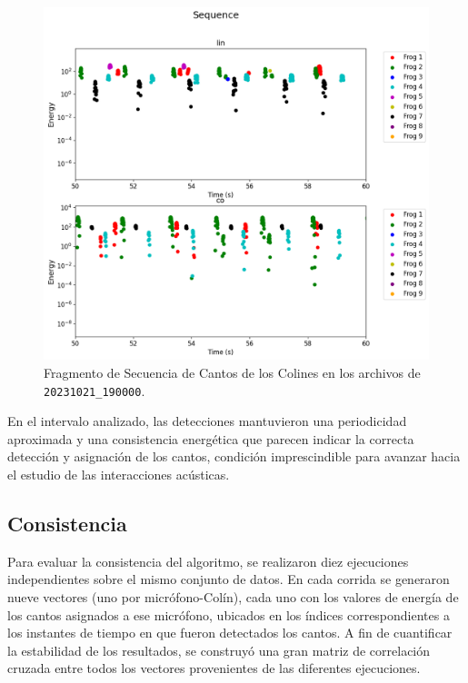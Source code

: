 \begin{figure}[ht]
    \centering
    \includegraphics[width=\columnwidth]{Graphics/sequence.png}
    \caption{Fragmento de Secuencia de Cantos de los Colines en los archivos de \texttt{20231021\_190000}.}
    \label{fig:seq}
\end{figure}

En el intervalo analizado, las detecciones mantuvieron una 
periodicidad aproximada y una consistencia energética que 
parecen indicar la correcta detección y asignación de los cantos, 
condición 
imprescindible para avanzar hacia el estudio de las 
interacciones acústicas.

\subsection{Consistencia}
\label{sec:res_consistencia}

Para evaluar la consistencia del algoritmo, se realizaron diez 
ejecuciones independientes sobre el mismo conjunto de datos. En 
cada corrida se generaron nueve vectores (uno por micrófono-Colín), 
cada uno con los valores
de energía de los cantos asignados a ese micrófono, ubicados en los 
índices correspondientes a los instantes de tiempo en que fueron 
detectados los cantos. A fin de cuantificar la 
estabilidad de los resultados, se construyó una gran matriz de 
correlación cruzada entre todos los vectores provenientes de las 
diferentes ejecuciones.

